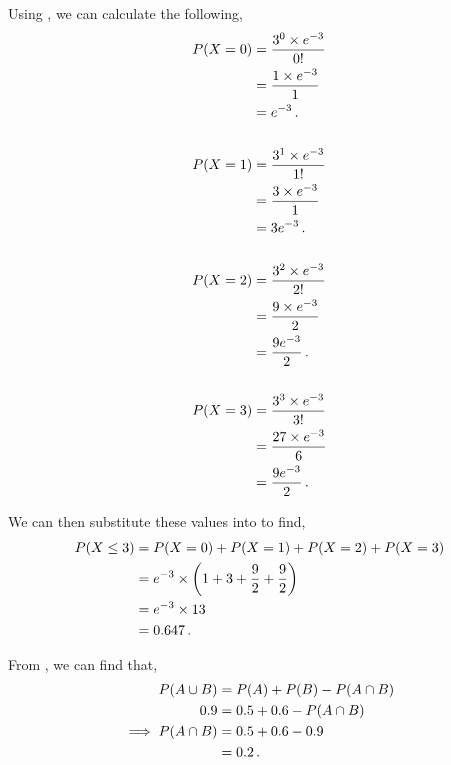 \begin{subquestions}
\begin{subsubquestions}
Using , we can calculate the following,
\begin{align}
	P(X = 0) & = \frac{ 3 ^ 0 \times e^{-3}}{0!} \nonumber \\
	         & = \frac{ 1 \times e^{-3}}{1} \nonumber \\
	         & = e^{-3} \,. \\ \nonumber \\
	P(X = 1) & = \frac{ 3 ^ 1 \times e^{-3}}{1!} \nonumber \\
			 & = \frac{ 3 \times e^{-3}}{1} \nonumber \\
			 & = 3e^{-3} \,. \\ \nonumber \\
	P(X = 2) & = \frac{ 3 ^ 2 \times e^{-3}}{2!} \nonumber \\
			 & = \frac{ 9 \times e^{-3}}{2} \nonumber \\
			 & = \frac{9e^{-3}}{2} \,. \\ \nonumber \\
	P(X = 3) & = \frac{ 3 ^ 3 \times e^{-3}}{3!} \nonumber \\
		  	 & = \frac{ 27 \times e^{-3}}{6} \nonumber \\
			 & = \frac{9e^{-3}}{2} \,. 
\end{align}

We can then substitute these values into  to find,
\begin{align}
	P(X \leq 3) & = P(X=0)+P(X=1)+P(X=2)+P(X=3) \nonumber \\
				& = e^{-3} \times \left(1+3+\frac{9}{2}+\frac{9}{2}\right) \nonumber \\
	            & = e^{-3} \times 13 \nonumber \\
	            & = 0.647 \,.
\end{align}

\end{subsubquestions}
	

\subquestion

\begin{subsubquestions}
	
\subsubquestion

From , we can find that,
\begin{align}
	P(A \cup B) & = P(A) + P(B) - P(A \cap B) \nonumber \\
	        0.9 & = 0.5+0.6-P(A \cap B) \nonumber \\
	        \implies P(A \cap B) & = 0.5+0.6-0.9 \nonumber \\
	                             & = 0.2 \,.
\end{align}
	

\end{subsubquestions}
\end{subquestions}
